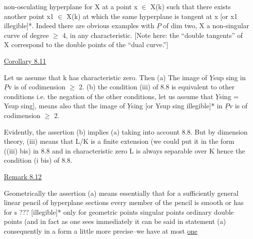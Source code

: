 
non-osculating hyperplane for X at a point x $\in$ X(k) such that
there exists another point x1 $\in$ X(k) at which the same hyperplane
is tangent at x [or x1 illegible]*. Indeed there are obvious
examples with $\underline{P}$ of dim two, X a non-singular curve of degree $\geq$ 4,
in any characteristic. [Note here: the ``double tangents'' of X
correspond to the double points of the ``dual curve.'']

\uline{Corollary 8.11}

Let us assume that k has characteristic zero. Then (a) The
image of $\underline{Y}$sup sing in $\underline{P}$v is of codimension $\geq$ 2. (b) the condition
(iii) of 8.8 is equivalent to other conditions i.e. the negation
of the other conditions, let us assume that $\underline{Y}$sing = Ysup sing], means
also that the image of $\underline{Y}$sing [or Ysup sing illegible]* in $\underline{P}$v is of
codimension $\geq$ 2.

Evidently, the assertion (b) implies (a) taking into account
8.8. But by dimension theory, (iii) means that L/K is a finite
extension (we could put it in the form ((iii) bis) in 8.8 and in
characteristic zero L is always separable over K hence the
condition (i bis) of 8.8.

\uline{Remark 8.12}

Geometrically the assertion (a) means essentially that for a
sufficiently general linear pencil of hyperplane sections every
member of the pencil is smooth or has for s ??? [illegible]* only
for geometric points singular points ordinary double points (and
in fact as one sees immediately it can be said in statement (a)
consequently in a form a little more precise--we have at most \uline{one}


